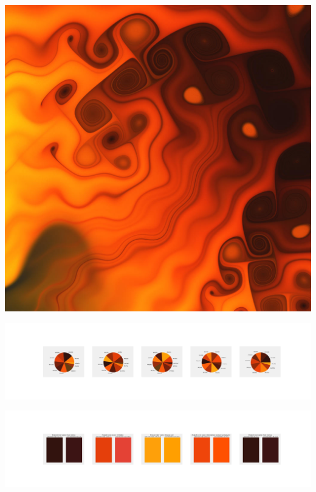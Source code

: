 \documentclass[11pt]{article}
\begin{document}
\begin{landscape}
    \begin{center}
    \includegraphics[width=\textwidth]{./nbimg/file (422).jpg}
    \end{center}

    \begin{center}
    \includegraphics[width=250mm]{./nbimg/pie-359.jpg}
    \end{center}

    \begin{center}
    \includegraphics[width=250mm]{./nbimg/peak-359.jpg}
    \end{center}
    


\end{landscape}
\end{document}

